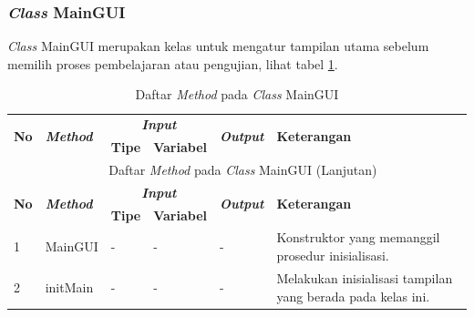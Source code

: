 \subsubsection{\textit{Class} MainGUI}
\noindent \textit{Class} MainGUI merupakan kelas untuk mengatur tampilan utama sebelum memilih proses pembelajaran atau pengujian, lihat tabel \ref{tbl:classMainGUI}.
\begingroup
\setlength{\LTleft}{-20cm plus -1fill}
\setlength{\LTright}{\LTleft}
\begin{small}
\begin{longtable}{|p{0.4cm}|p{2cm}|p{1.8cm}|p{1.8cm}|p{1.7cm}|p{3.55cm}|}
	\caption{Daftar \textit{Method} pada \textit{Class} MainGUI \label{tbl:classMainGUI}}\\
	\hline
	\multirow{2}{*}{\textbf{No}} & \multirow{2}{*}{\textit{\textbf{Method}}} & \multicolumn{2}{c|}{\textit{\textbf{Input}}} & \multirow{2}{*}{\textit{\textbf{Output}}} & 
	\multirow{2}{*}{\textbf{Keterangan}}\\
	\cline{3-4}
	& & \textbf{Tipe} & \textbf{Variabel} & & \\
	\endfirsthead
	\multicolumn{6}{c}{\textbf{\tablename~\thetable} Daftar \textit{Method} pada \textit{Class} MainGUI (Lanjutan)} \\
	\hline
	\multirow{2}{*}{\textbf{No}} & \multirow{2}{*}{\textit{\textbf{Method}}} & \multicolumn{2}{c|}{\textit{\textbf{Input}}} & \multirow{2}{*}{\textit{\textbf{Output}}} & 
	\multirow{2}{*}{\textbf{Keterangan}}\\
	\cline{3-4}
	& & \textbf{Tipe} & \textbf{Variabel} & & \\
	\endhead
	\hline
	1 & MainGUI & - & - & - & Konstruktor yang memanggil prosedur inisialisasi.\\
	\hline
	2 & initMain & - & - & - & Melakukan inisialisasi tampilan yang berada pada kelas ini.\\
	\hline
\end{longtable}
\end{small}
\endgroup

